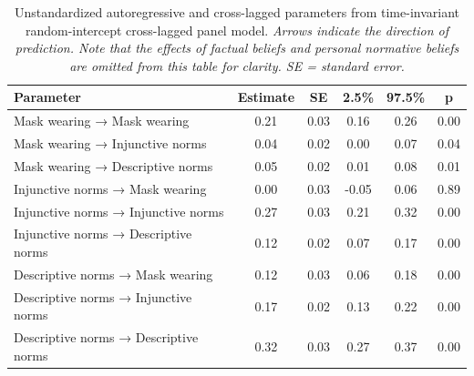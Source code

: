\documentclass[
  man, donotrepeattitle,floatsintext]{apa6}
\begin{document}
\begin{table}[tbp]

\begin{center}
\begin{threeparttable}

\caption{\label{tab:constrainedTable1}Unstandardized autoregressive and cross-lagged parameters from time-invariant random-intercept cross-lagged panel model. \emph{Arrows indicate the direction of prediction. Note that the effects of factual beliefs and personal normative beliefs are omitted from this table for clarity. SE = standard error.}}

\begin{tabular}{lccccc}
\toprule
Parameter & \multicolumn{1}{c}{Estimate} & \multicolumn{1}{c}{SE} & \multicolumn{1}{c}{2.5\%} & \multicolumn{1}{c}{97.5\%} & \multicolumn{1}{c}{p}\\
\midrule
Mask wearing → Mask wearing & 0.21 & 0.03 & 0.16 & 0.26 & 0.00\\
Mask wearing → Injunctive norms & 0.04 & 0.02 & 0.00 & 0.07 & 0.04\\
Mask wearing → Descriptive norms & 0.05 & 0.02 & 0.01 & 0.08 & 0.01\\
Injunctive norms → Mask wearing & 0.00 & 0.03 & -0.05 & 0.06 & 0.89\\
Injunctive norms → Injunctive norms & 0.27 & 0.03 & 0.21 & 0.32 & 0.00\\
Injunctive norms → Descriptive norms & 0.12 & 0.02 & 0.07 & 0.17 & 0.00\\
Descriptive norms → Mask wearing & 0.12 & 0.03 & 0.06 & 0.18 & 0.00\\
Descriptive norms → Injunctive norms & 0.17 & 0.02 & 0.13 & 0.22 & 0.00\\
Descriptive norms → Descriptive norms & 0.32 & 0.03 & 0.27 & 0.37 & 0.00\\
\bottomrule
\end{tabular}

\end{threeparttable}
\end{center}

\end{table}
\end{document}
